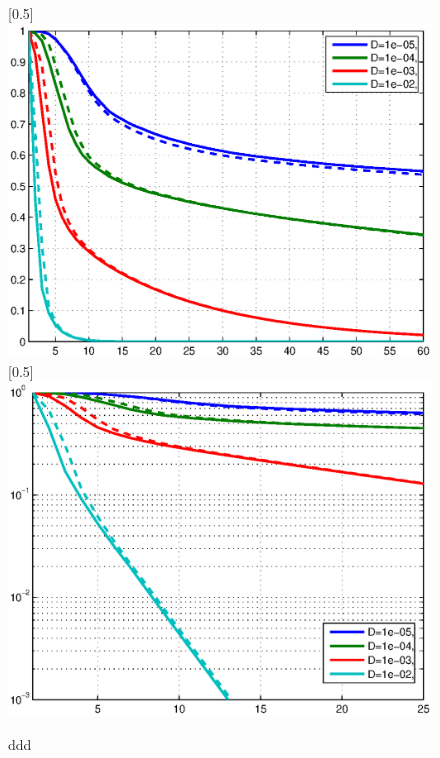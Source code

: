 \begin{figure}
 \centerline{
  \scalebox{0.5}[0.5]{\includegraphics{PrchangeD.eps}}
  \scalebox{0.5}[0.5]{\includegraphics{PrchangeDlog.eps}}
} \caption{ddd}
  \label{PrchangeD}
\end{figure}


